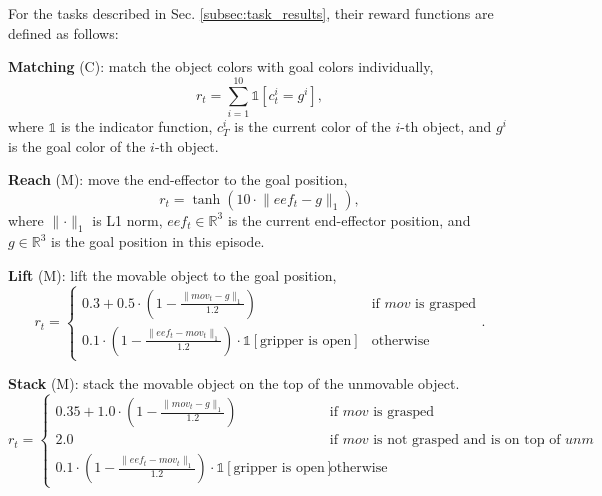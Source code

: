 For the tasks described in Sec. \ref{subsec:task_results}, their reward functions are defined as follows:

\textbf{Matching} (C): match the object colors with goal colors individually,
\begin{equation}
    r_t = \sum_{i=1}^{10} \mathds{1}\left[ c_t^i = g^i \right], \nonumber
\end{equation}
where $\mathds{1}$ is the indicator function, $c_T^i$ is the current color of the $i$-th object, and $g^i$ is the goal color of the $i$-th object.

\textbf{Reach} (M): move the end-effector to the goal position,
\begin{equation}
    r_t = \tanh(10 \cdot \lVert eef_t - g\rVert_1), \nonumber
\end{equation}
where $\lVert \cdot \rVert_1$ is L1 norm, $eef_t \in \mathbb{R}^3$ is the current end-effector position, and $g \in \mathbb{R}^3$ is the goal position in this episode.

\textbf{Lift} (M): lift the movable object to the goal position,
\begin{equation}
r_t = 
\begin{cases}
0.3 + 0.5 \cdot (1  - \frac{\lVert mov_t - g\rVert_1}{1.2})                                                         & \text{if $mov$ is grasped}\\
0.1 \cdot (1 - \frac{\lVert eef_t - mov_t\rVert_1}{1.2}) \cdot \mathds{1}\left[\text{gripper is open} \right]       & \text{otherwise}
\end{cases}.
\nonumber
\end{equation}

\textbf{Stack} (M): stack the movable object on the top of the unmovable object.
\begin{equation}
r_t = 
\begin{cases}
0.35 + 1.0 \cdot (1  - \frac{\lVert mov_t - g\rVert_1}{1.2})                                                             & \text{if $mov$ is grasped}\\
2.0                                                                                                                 & \text{if $mov$ is not grasped and is on top of $unm$} \\
0.1 \cdot (1 - \frac{\lVert eef_t - mov_t\rVert_1}{1.2}) \cdot \mathds{1}\left[\text{gripper is open} \right]       & \text{otherwise}
\end{cases}.
\nonumber
\end{equation}

